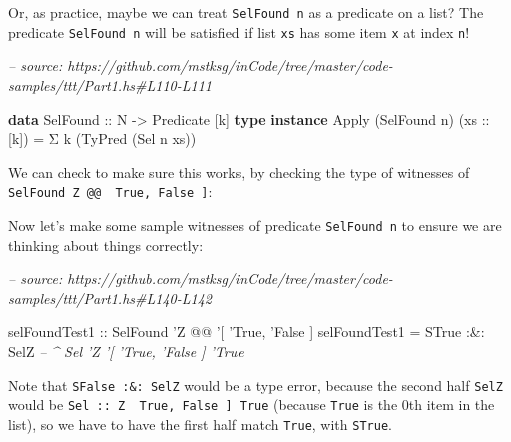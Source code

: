 \documentclass[]{article}
\newenvironment{Shaded}{}{}
\newcommand{\CommentTok}[1]{\textcolor[rgb]{0.38,0.63,0.69}{\textit{#1}}}
\newcommand{\DataTypeTok}[1]{\textcolor[rgb]{0.56,0.13,0.00}{#1}}
\newcommand{\FunctionTok}[1]{\textcolor[rgb]{0.02,0.16,0.49}{#1}}
\newcommand{\KeywordTok}[1]{\textcolor[rgb]{0.00,0.44,0.13}{\textbf{#1}}}
\newcommand{\NormalTok}[1]{#1}
\newcommand{\OtherTok}[1]{\textcolor[rgb]{0.00,0.44,0.13}{#1}}
\begin{document}
Or, as practice, maybe we can treat \texttt{SelFound\ n} as a predicate on a
list? The predicate \texttt{SelFound\ n} will be satisfied if list \texttt{xs}
has some item \texttt{x} at index \texttt{n}!

\begin{Shaded}
\begin{Highlighting}[]
\CommentTok{-- source: https://github.com/mstksg/inCode/tree/master/code-samples/ttt/Part1.hs#L110-L111}

\KeywordTok{data} \DataTypeTok{SelFound}\OtherTok{ ::} \DataTypeTok{N} \OtherTok{->} \DataTypeTok{Predicate}\NormalTok{ [k]}
\KeywordTok{type} \KeywordTok{instance} \DataTypeTok{Apply}\NormalTok{ (}\DataTypeTok{SelFound}\NormalTok{ n) (}\OtherTok{xs ::}\NormalTok{ [k]) }\FunctionTok{=}\NormalTok{ Σ k (}\DataTypeTok{TyPred}\NormalTok{ (}\DataTypeTok{Sel}\NormalTok{ n xs))}
\end{Highlighting}
\end{Shaded}

We can check to make sure this works, by checking the type of witnesses of
\texttt{SelFound\ \textquotesingle{}Z\ @@\ \textquotesingle{}{[}\ \textquotesingle{}True,\ \textquotesingle{}False\ {]}}:

Now let's make some sample witnesses of predicate \texttt{SelFound\ n} to ensure
we are thinking about things correctly:

\begin{Shaded}
\begin{Highlighting}[]
\CommentTok{-- source: https://github.com/mstksg/inCode/tree/master/code-samples/ttt/Part1.hs#L140-L142}

\OtherTok{selFoundTest1 ::} \DataTypeTok{SelFound}\NormalTok{ '}\DataTypeTok{Z} \FunctionTok{@@}\NormalTok{ '[ '}\DataTypeTok{True}\NormalTok{, '}\DataTypeTok{False}\NormalTok{ ]}
\NormalTok{selFoundTest1 }\FunctionTok{=} \DataTypeTok{STrue} \FunctionTok{:&:} \DataTypeTok{SelZ}
                       \CommentTok{-- ^ Sel 'Z '[ 'True, 'False ] 'True}
\end{Highlighting}
\end{Shaded}

Note that \texttt{SFalse\ :\&:\ SelZ} would be a type error, because the second
half \texttt{SelZ} would be
\texttt{Sel\ ::\ \textquotesingle{}Z\ \textquotesingle{}{[}\ \textquotesingle{}True,\ \textquotesingle{}False\ {]}\ \textquotesingle{}True}
(because \texttt{\textquotesingle{}True} is the 0th item in the list), so we
have to have the first half match \texttt{\textquotesingle{}True}, with
\texttt{STrue}.
\end{document}
